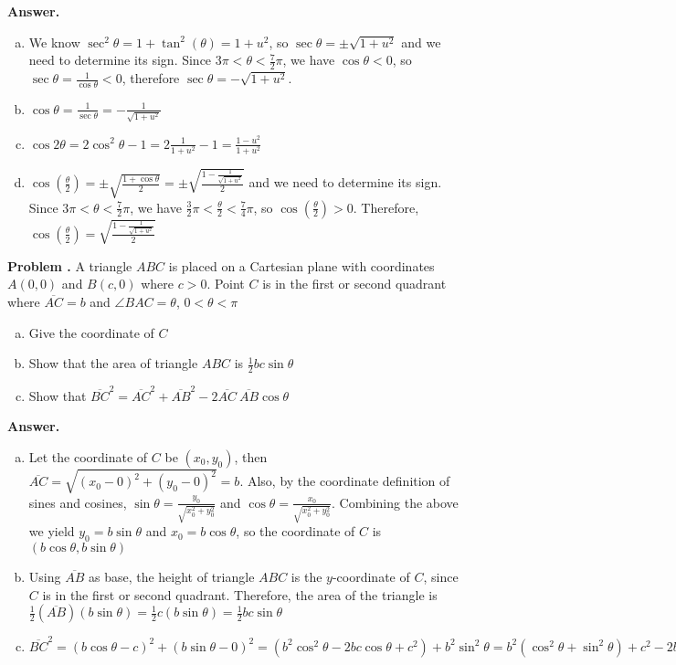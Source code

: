 \documentclass[11pt,letterpaper]{article}
\newcounter{problem}
\newcommand{\problem}{
	\stepcounter{problem}%
	\noindent \textbf{Problem \theproblem. }%
}
\newcommand{\answer}{\noindent \textbf{Answer. }}
\begin{document}
\answer
\begin{enumerate}[(a)]
    \item We know $\sec^2\theta = 1+\tan^2(\theta) = 1+u^2$, so $\sec \theta = \pm \sqrt{1+u^2}$ and we need to determine its sign.  Since $3\pi < \theta < \frac{7}{2}\pi$, we have $\cos \theta < 0$, so $\sec \theta = \frac{1}{\cos \theta} <0$, therefore $\sec \theta = -\sqrt{1+u^2}$.
    \item $\cos \theta = \frac{1}{\sec \theta} = -\frac{1}{\sqrt{1+u^2}}$
    \item $\cos 2\theta = 2 \cos^2\theta - 1 = 2 \frac{1}{1+u^2} - 1 = \frac{1-u^2}{1+u^2}$
    \item $\cos\left(\frac{\theta}{2}\right) = \pm \sqrt{\frac{1+\cos \theta}{2}} = \pm \sqrt{\frac{1-\frac{1}{\sqrt{1+u^2}}}{2}}$ and we need to determine its sign.  Since $3\pi < \theta < \frac{7}{2}\pi$, we have $\frac{3}{2}\pi < \frac{\theta}{2} < \frac{7}{4}\pi$, so $\cos \left(\frac{\theta}{2}\right) > 0$.  Therefore, $\cos \left(\frac{\theta}{2}\right) = \sqrt{\frac{1-\frac{1}{\sqrt{1+u^2}}}{2}}$
\end{enumerate}\vspace{6mm}

\problem A triangle $ABC$ is placed on a Cartesian plane with coordinates $A(0, 0)$ and $B(c, 0)$ where $c>0$. Point $C$ is in the first or second quadrant where $\overline{AC} = b$ and $\angle BAC = \theta$, $0 < \theta < \pi$
\begin{enumerate}[(a)]
    \item Give the coordinate of $C$
    \item Show that the area of triangle $ABC$ is $\frac{1}{2} bc \sin \theta$
    \item Show that $\overline{BC}^2 = \overline{AC}^2 + \overline{AB}^2 - 2\overline{AC}~\overline{AB} \cos\theta$
\end{enumerate}\vspace{6mm}

\answer
\begin{enumerate}[(a)]
    \item Let the coordinate of $C$ be $(x_0, y_0)$, then $\overline{AC} = \sqrt{(x_0-0)^2+(y_0-0)^2} = b$.  Also, by the coordinate definition of sines and cosines, $\sin \theta = \frac{y_0}{\sqrt{x_0^2+y_0^2}}$ and $\cos \theta = \frac{x_0}{\sqrt{x_0^2+y_0^2}}$. Combining the above we yield $y_0 = b\sin \theta$ and $x_0 = b\cos \theta$, so the coordinate of $C$ is $(b\cos \theta, b\sin \theta)$
    \item Using $\overline{AB}$ as base, the height of triangle $ABC$ is the $y$-coordinate of $C$, since $C$ is in the first or second quadrant.  Therefore, the area of the triangle is $\frac{1}{2}(\overline{AB})(b\sin \theta) = \frac{1}{2}c(b \sin \theta) = \frac{1}{2} bc \sin \theta$
    \item $\overline{BC}^2 = (b \cos \theta - c)^2 + (b \sin \theta - 0)^2 = (b^2 \cos^2 \theta - 2bc \cos \theta + c^2) + b^2 \sin^2 \theta = b^2(\cos^2 \theta + \sin^2  \theta) + c^2 - 2 bc \cos \theta = b^2 + c^2 - 2bc \cos \theta = \overline{AC}^2 + \overline{AB}^2 - 2\overline{AC}~\overline{AB} \cos\theta$
\end{enumerate}\vspace{6mm}
\end{document}
